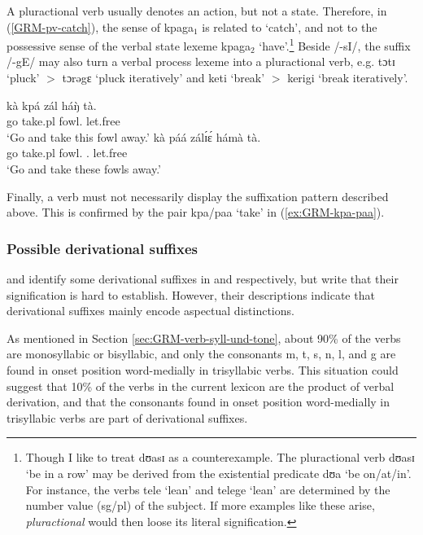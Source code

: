 \begin{exe}
\begin{exe}
\begin{exe}
\begin{exe}
\begin{exe}
\begin{exe}
\begin{exe}
\begin{exe}
\begin{exe}
\begin{exe}
\begin{exe}
\begin{exe}
A pluractional verb usually denotes an action, but not a state. Therefore, in (\ref{GRM-pv-catch}), the sense of {\sls kpaga}$_{1}$  is related to `catch', and not to the  possessive sense of the verbal state lexeme   {\sls kpaga}$_{2}$ `have'.\footnote{Though I like to treat {\sls dʊasɪ} as a counterexample.  The pluractional verb {\sls dʊasɪ} `be in a row'  may be  derived from the existential predicate {\sls dʊa} `be on/at/in'.  For instance, the verbs {\sls tele} `lean' and {\sls telege} `lean' are determined by the number value ({\sc sg}/{\sc  pl})  of the subject.  If more examples like these  arise, {\it pluractional} would then loose its literal signification.} Beside {\sls /-sI/}, the suffix {\sls /-gE/} may also turn a verbal process lexeme into a pluractional verb, e.g.   {\sls tɔtɪ} `pluck' $>$ {\sls  tɔrəgɛ} `pluck iteratively' and  {\sls keti} `break'  $>$ {\sls kerigi} `break iteratively'.

\ea\label{ex:GRM-kpa-paa}
  
 \ea\label{ex:GRM-kpa}
\gll kà kpá zál háŋ̀ tà.\\
go take.{\sc pl} fowl.{\sg} {\dem} let.free\\
\glt `Go and take this fowl away.'
   \ex\label{ex:GRM-paa}
\gll kà páá zálɪ́ɛ́ hámà tà.\\
go take.{\sc pl} fowl.{\pl} {\dem}.{\pl}  let.free\\
\glt `Go and take these fowls away.'
 
\z 
 \z


Finally, a  verb must not necessarily display the
suffixation pattern described above. This is confirmed by the pair  {\sls kpa}/{\sls paa} `take'  in (\ref{ex:GRM-kpa-paa}).




\subsubsection{Possible derivational suffixes}
\label{sec:GRM-deri-suff}


\citet[37]{Daku09} and \citet[69]{Bonv88} identify some derivational suffixes 
in 
 and  respectively, but write that their signification is hard to 
establish.  However, their descriptions indicate that  derivational suffixes 
mainly encode aspectual distinctions.

As mentioned in Section \ref{sec:GRM-verb-syll-und-tone}, about 90\% of the verbs are monosyllabic or bisyllabic, and  only the consonants {\sls m, t, s, n,  l,} and {\sls g} are found  in onset position word-medially in trisyllabic verbs. This situation could suggest that 10\% of the verbs in the current lexicon are the product of verbal derivation, and that the consonants found  in onset position word-medially in trisyllabic verbs are part of  derivational suffixes. 



\end{exe}
\end{exe}
\end{exe}
\end{exe}
\end{exe}
\end{exe}
\end{exe}
\end{exe}
\end{exe}
\end{exe}
\end{exe}
\end{exe}
